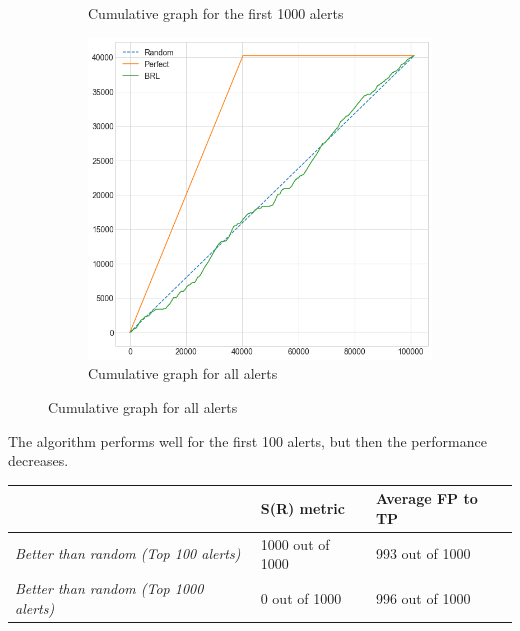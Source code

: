 \begin{figure}[H]
\begin{subfigure}{.5\textwidth}
		\caption{Cumulative graph for the first 1000 alerts}\label{}
	\end{subfigure}%
	\begin{subfigure}{.5\textwidth}
		\centering
		\includegraphics[scale=0.3]{./src/brls/brls_cumulative_graph_all.png}
		\caption{Cumulative graph for all alerts}\label{}
	\end{subfigure}  
\end{figure}

The algorithm performs well for the first 100 alerts, but then the performance decreases. 

\begin{table}[H]
	\centering
	\begin{tabular}{@{}lll@{}}
		\toprule
		& \textbf{S(R) metric} & \textbf{Average FP to TP} \\ \midrule
		\textit{Better than random (Top 100 alerts)}  & 1000 out of 1000       & 993 out of 1000           \\
		\textit{Better than random (Top 1000 alerts)} & 0 out of 1000      & 996 out of 1000          \\ \bottomrule
	\end{tabular}
\end{table}